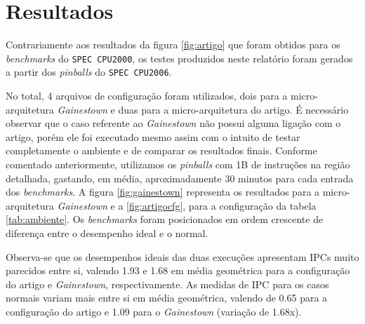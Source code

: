 \documentclass[12pt]{article}
\begin{document}
\section{Resultados}

Contrariamente aos resultados da figura \ref{fig:artigo} que foram obtidos para
os \textit{benchmarks} do \texttt{SPEC CPU2000}, os testes produzidos neste
relatório foram gerados a partir dos \textit{pinballs} do \texttt{SPEC CPU2006}. 

No total, 4 arquivos de configuração foram utilizados, dois para a
micro-arquitetura \textit{Gainestown} e duas para a micro-arquitetura do artigo.
É necessário observar que o caso referente ao \textit{Gainestown} não possui
alguma ligação com o artigo, porém ele foi executado mesmo assim com o intuito
de testar completamente o ambiente e de comparar os resultados finais. Conforme
comentado anteriormente, utilizamos os \textit{pinballs} com 1B de instruções na
região detalhada, gastando, em média, aproximadamente 30 minutos para cada
entrada dos \textit{benchmarks}.  A figura \ref{fig:gainestown} representa os
resultados para a micro-arquitetura \textit{Gainestown} e a \ref{fig:artigocfg},
para a configuração da tabela \ref{tab:ambiente}. Os \textit{benchmarks} foram
posicionados em ordem crescente de diferença entre o desempenho ideal e o
normal.

Observa-se que os desempenhos ideais das duas execuções apresentam IPCs 
muito parecidos entre si, valendo 1.93 e 1.68 em média geométrica para a
configuração do artigo e \textit{Gainestown}, respectivamente. As medidas de IPC
para os casos normais variam mais entre si em média geométrica, valendo de 0.65
para a configuração do artigo e 1.09 para o \textit{Gainestown} (variação de
1.68x).
 
\end{document}
